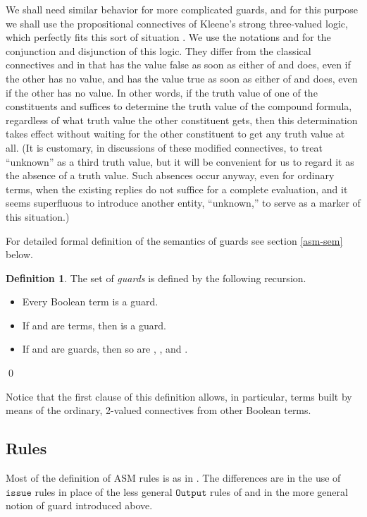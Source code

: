 \documentclass{LMCS}
\theoremstyle{definition}
\newtheorem{df}[thm]{Definition}
\newenvironment{ls}{\begin{itemize}}{\end{itemize}}
\newcommand{\ttt}[1]{\ensuremath{\mathtt {#1}}}
\begin{document}
We shall need similar behavior for more complicated guards, and for
this purpose we shall use the propositional connectives of Kleene's
strong three-valued logic, which perfectly fits this sort of situation
\cite[\S64]{Kleene}.  We use the notations  and  for the
conjunction and disjunction of this logic.  They differ from the
classical connectives  and  in that  has
the value false as soon as either of  and  does, even if
the other has no value, and  has the value true as soon
as either of  and  does, even if the other has no value.
In other words, if the truth value of one of the constituents 
and  suffices to determine the truth value of the compound
formula, regardless of what truth value the other constituent gets,
then this determination takes effect without waiting for the other
constituent to get any truth value at all.  (It is customary, in
discussions of these modified connectives, to treat ``unknown'' as a
third truth value, but it will be convenient for us to regard it as
the absence of a truth value.  Such absences occur anyway, even for
ordinary terms, when the
existing replies do not suffice for a complete
evaluation, and it seems superfluous to introduce another entity,
``unknown,'' to serve as a marker of this situation.)

For detailed formal definition of the semantics of guards see
section \ref{asm-sem} below.

\begin{df}
  The set of \emph{guards} is defined by the following recursion.
  \begin{ls}
    \item Every Boolean term is a guard.
    \item If  and  are terms, then  is a guard.
    \item If  and  are guards, then so are
    , , and .
  \end{ls}
\qed\end{df}

Notice that the first clause of this definition allows, in particular,
terms built by means of the ordinary, 2-valued connectives from other
Boolean terms.

\subsection{Rules}

Most of the definition of ASM rules is as in \cite{oa2}.  The
differences are in the use of \ttt{issue} rules in place of the
less general \ttt{Output} rules of \cite{oa2} and in the more general
notion of guard introduced above.
\end{document}

